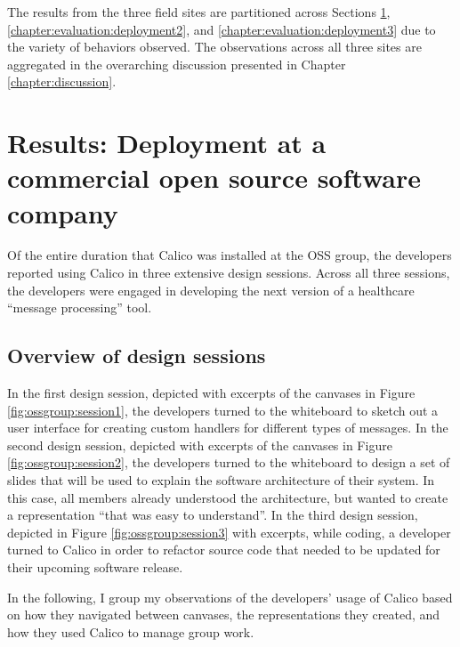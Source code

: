 \documentclass[12pt,fleqn]{ucithesis}
\begin{document}
The results from the three field sites are partitioned across Sections \ref{chapter:evaluation:deployment1}, \ref{chapter:evaluation:deployment2}, and \ref{chapter:evaluation:deployment3} due to the variety of behaviors observed. The observations across all three sites are aggregated in the overarching discussion presented in Chapter \ref{chapter:discussion}.

\section{Results: Deployment at a commercial open source software company}
\label{chapter:evaluation:deployment1}

Of the entire duration that Calico was installed at the OSS group, the developers reported using Calico in three extensive design sessions. Across all three sessions, the developers were engaged in developing the next version of a healthcare ``message processing'' tool. 

\subsection{Overview of design sessions}

In the first design session, depicted with excerpts of the canvases in Figure \ref{fig:ossgroup:session1}, the developers turned to the whiteboard to sketch out a user interface for creating custom handlers for different types of messages. In the second design session, depicted with excerpts of the canvases in Figure \ref{fig:ossgroup:session2}, the developers turned to the whiteboard to design a set of slides that will be used to explain the software architecture of their system. In this case, all members already understood the architecture, but wanted to create a representation ``that was easy to understand''. In the third design session, depicted in Figure \ref{fig:ossgroup:session3} with excerpts, while coding, a developer turned to Calico in order to refactor source code that needed to be updated for their upcoming software release.

In the following, I group my observations of the developers' usage of Calico based on how they navigated between canvases, the representations they created, and how they used Calico to manage group work.
\end{document}
